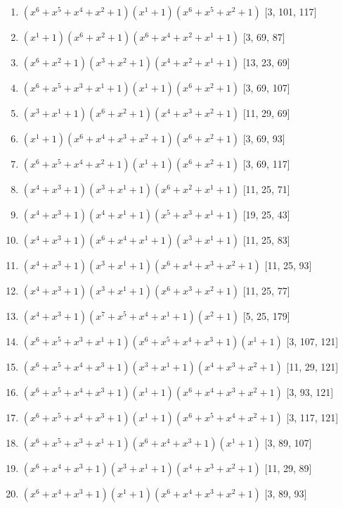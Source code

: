 \documentclass[10pt,twocolumn]{article}
\begin{document}
\begin{enumerate}
\item $(x^{6} + x^{5} + x^{4} + x^{2} + 1)(x^{1} + 1)(x^{6} + x^{5} + x^{2} + 1)$  [3, 101, 117]
\item $(x^{1} + 1)(x^{6} + x^{2} + 1)(x^{6} + x^{4} + x^{2} + x^{1} + 1)$  [3, 69, 87]
\item $(x^{6} + x^{2} + 1)(x^{3} + x^{2} + 1)(x^{4} + x^{2} + x^{1} + 1)$  [13, 23, 69]
\item $(x^{6} + x^{5} + x^{3} + x^{1} + 1)(x^{1} + 1)(x^{6} + x^{2} + 1)$  [3, 69, 107]
\item $(x^{3} + x^{1} + 1)(x^{6} + x^{2} + 1)(x^{4} + x^{3} + x^{2} + 1)$  [11, 29, 69]
\item $(x^{1} + 1)(x^{6} + x^{4} + x^{3} + x^{2} + 1)(x^{6} + x^{2} + 1)$  [3, 69, 93]
\item $(x^{6} + x^{5} + x^{4} + x^{2} + 1)(x^{1} + 1)(x^{6} + x^{2} + 1)$  [3, 69, 117]
\item $(x^{4} + x^{3} + 1)(x^{3} + x^{1} + 1)(x^{6} + x^{2} + x^{1} + 1)$  [11, 25, 71]
\item $(x^{4} + x^{3} + 1)(x^{4} + x^{1} + 1)(x^{5} + x^{3} + x^{1} + 1)$  [19, 25, 43]
\item $(x^{4} + x^{3} + 1)(x^{6} + x^{4} + x^{1} + 1)(x^{3} + x^{1} + 1)$  [11, 25, 83]
\item $(x^{4} + x^{3} + 1)(x^{3} + x^{1} + 1)(x^{6} + x^{4} + x^{3} + x^{2} + 1)$  [11, 25, 93]
\item $(x^{4} + x^{3} + 1)(x^{3} + x^{1} + 1)(x^{6} + x^{3} + x^{2} + 1)$  [11, 25, 77]
\item $(x^{4} + x^{3} + 1)(x^{7} + x^{5} + x^{4} + x^{1} + 1)(x^{2} + 1)$  [5, 25, 179]
\item $(x^{6} + x^{5} + x^{3} + x^{1} + 1)(x^{6} + x^{5} + x^{4} + x^{3} + 1)(x^{1} + 1)$  [3, 107, 121]
\item $(x^{6} + x^{5} + x^{4} + x^{3} + 1)(x^{3} + x^{1} + 1)(x^{4} + x^{3} + x^{2} + 1)$  [11, 29, 121]
\item $(x^{6} + x^{5} + x^{4} + x^{3} + 1)(x^{1} + 1)(x^{6} + x^{4} + x^{3} + x^{2} + 1)$  [3, 93, 121]
\item $(x^{6} + x^{5} + x^{4} + x^{3} + 1)(x^{1} + 1)(x^{6} + x^{5} + x^{4} + x^{2} + 1)$  [3, 117, 121]
\item $(x^{6} + x^{5} + x^{3} + x^{1} + 1)(x^{6} + x^{4} + x^{3} + 1)(x^{1} + 1)$  [3, 89, 107]
\item $(x^{6} + x^{4} + x^{3} + 1)(x^{3} + x^{1} + 1)(x^{4} + x^{3} + x^{2} + 1)$  [11, 29, 89]
\item $(x^{6} + x^{4} + x^{3} + 1)(x^{1} + 1)(x^{6} + x^{4} + x^{3} + x^{2} + 1)$  [3, 89, 93]

\end{enumerate}
\end{document}
